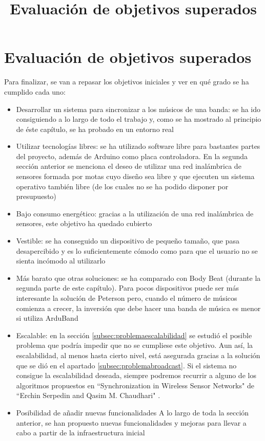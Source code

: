 \section{Evaluación de objetivos superados}
\title{Evaluación de objetivos superados}

Para finalizar, se van a repasar los objetivos iniciales y ver en qué grado se ha
cumplido cada uno:

\begin{itemize}
  \item Desarrollar un sistema para sincronizar a los músicos de una banda:
    se ha ido consiguiendo a lo largo de todo el trabajo y, como se ha mostrado al principio
    de éste capítulo, se ha probado en un entorno real
  \item Utilizar tecnologías libres:
    se ha utilizado software libre para bastantes partes del proyecto, además de Arduino
    como placa controladora. En la segunda sección anterior se menciona el deseo de utilizar
    una red inalámbrica de sensores formada por motas cuyo diseño sea libre y que ejecuten un sistema operativo
    también libre (de los cuales no se ha podido disponer por presupuesto)
  \item Bajo consumo energético:
    gracias a la utilización de una red inalámbrica de sensores, este objetivo ha quedado cubierto
  \item Vestible:
    se ha conseguido un dispositivo de pequeño tamaño, que pasa desapercibido y es lo suficientemente
    cómodo como para que el usuario no se sienta incómodo al utilizarlo
  \item Más barato que otras soluciones:
    se ha comparado con Body Beat (durante la segunda parte de este capítulo). Para pocos dispositivos
    puede ser más interesante la solución de Peterson pero, cuando el número de músicos comienza a
    crecer, la inversión que debe hacer una banda de música es menor si utiliza ArduBand
  \item Escalable:
    en la sección \ref{subsec:problemaescalabilidad} se estudió el posible  problema que podría impedir
    que no se cumpliese este objetivo. Aun así, la escalabilidad, al menos hasta cierto nivel, está asegurada
    gracias a la solución que se dió en el apartado \ref{subsec:problemabroadcast}. Si el sistema no consigue
    la escalabilidad deseada, siempre podremos recurrir a alguno de los algoritmos propuestos en ``Synchronization
    in Wireless Sensor Networks" de ``Erchin Serpedin and Qasim M. Chaudhari" \cite{serpedin}.
  \item Posibilidad de añadir nuevas funcionalidades
    A lo largo de toda la sección anterior, se han propuesto nuevas funcionalidades y mejoras para llevar
    a cabo a partir de la infraestructura inicial
\end{itemize}
